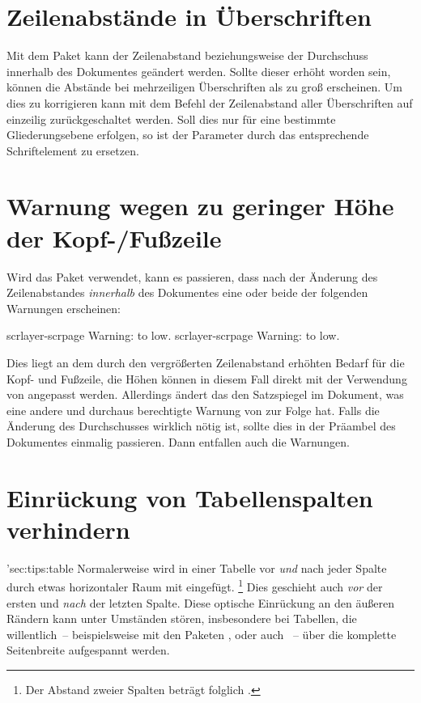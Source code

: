 \section{Zeilenabstände in Überschriften}
\label{sec:tips:headings}
Mit dem Paket  kann der Zeilenabstand beziehungsweise der 
Durchschuss innerhalb des Dokumentes geändert werden. Sollte dieser erhöht 
worden sein, können die Abstände bei mehrzeiligen Überschriften als zu groß 
erscheinen. Um dies zu korrigieren kann mit dem Befehl %
 der 
Zeilenabstand aller Überschriften auf einzeilig zurückgeschaltet werden. Soll 
dies nur für eine bestimmte Gliederungsebene erfolgen, so ist der Parameter
 durch das entsprechende Schriftelement zu ersetzen.



\section{Warnung wegen zu geringer Höhe der Kopf-/Fußzeile}
\label{sec:tips:headline}
Wird das Paket  verwendet, kann es passieren, dass nach der 
Änderung des Zeilenabstandes \emph{innerhalb} des Dokumentes eine oder beide 
der folgenden Warnungen erscheinen:
%
\begin{quoting}
\begin{Code}
scrlayer-scrpage Warning: \headheight to low.
scrlayer-scrpage Warning: \footheight to low.
\end{Code}
\end{quoting}
%
Dies liegt an dem durch den vergrößerten Zeilenabstand erhöhten Bedarf für die
Kopf- und Fußzeile, die Höhen können in diesem Fall direkt mit der Verwendung 
von  angepasst werden. Allerdings ändert das den 
Satzspiegel im Dokument, was eine andere und durchaus berechtigte Warnung von 
 zur Folge hat. Falls die Änderung des Durchschusses wirklich 
nötig ist, sollte dies in der Präambel des Dokumentes einmalig passieren. Dann 
entfallen auch die Warnungen.



\section{Einrückung von Tabellenspalten verhindern}%
\manualhyperdef'{sec:tips:table}
%
Normalerweise wird in einer Tabelle vor \emph{und} nach jeder Spalte durch 
 etwas horizontaler Raum mit  
eingefügt.%
\footnote{%
  Der Abstand zweier Spalten beträgt folglich .%
}
Dies geschieht auch \emph{vor} der ersten und \emph{nach} der letzten Spalte. 
Diese optische Einrückung an den äußeren Rändern kann unter Umständen stören, 
insbesondere bei Tabellen, die willentlich~-- beispielsweise mit den Paketen 
,  oder auch ~-- über die 
komplette Seitenbreite aufgespannt werden.

